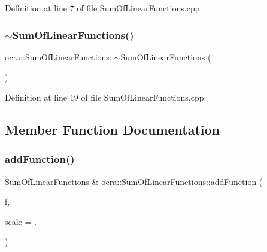 Definition at line 7 of file Sum\+Of\+Linear\+Functions.\+cpp.

\hypertarget{classocra_1_1SumOfLinearFunctions_a0ca0f87d5eee6117cd521130a831d90e}{}\label{classocra_1_1SumOfLinearFunctions_a0ca0f87d5eee6117cd521130a831d90e} 
\subsubsection{\texorpdfstring{$\sim$\+Sum\+Of\+Linear\+Functions()}{~SumOfLinearFunctions()}}
{\footnotesize\ttfamily ocra\+::\+Sum\+Of\+Linear\+Functions\+::$\sim$\+Sum\+Of\+Linear\+Functions (\begin{DoxyParamCaption}{ }\end{DoxyParamCaption})}



Definition at line 19 of file Sum\+Of\+Linear\+Functions.\+cpp.



\subsection{Member Function Documentation}
\hypertarget{classocra_1_1SumOfLinearFunctions_a9ab412e1232557d36a84145360d57da7}{}\label{classocra_1_1SumOfLinearFunctions_a9ab412e1232557d36a84145360d57da7} 
\subsubsection{\texorpdfstring{add\+Function()}{addFunction()}}
{\footnotesize\ttfamily \hyperlink{classocra_1_1SumOfLinearFunctions}{Sum\+Of\+Linear\+Functions} \& ocra\+::\+Sum\+Of\+Linear\+Functions\+::add\+Function (\begin{DoxyParamCaption}\item[{\hyperlink{classocra_1_1LinearFunction}{Linear\+Function} \&}]{f,  }\item[{double}]{scale = {.} }\end{DoxyParamCaption})}



